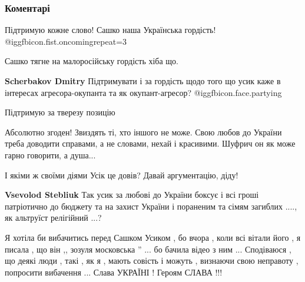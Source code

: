  
 
 
 
 
\subsubsection{Коментарі}
\label{sec:27_09_2021.fb.bojechko_andrej.1.istoria_z_usikom.cmt}

\begin{itemize} %
Підтримую кожне слово! Сашко наша Українська гордість!  @igg{fbicon.fist.oncoming}{repeat=3} 

\begin{itemize} %
Сашко тягне на малоросійську гордість хіба що.

\textbf{Scherbakov Dmitry} Підтримувати і за гордість щодо того що усик каже в
інтересах агресора-окупанта та як окупант-агресор? @igg{fbicon.face.partying} 
\end{itemize} %

Підтримую за тверезу позицію


Абсолютно згоден! Звиздять ті, хто іншого не може. Свою любов до України треба
доводити справами, а не словами, нехай і красивими. Шуфрич он як може гарно
говорити, а душа...

\begin{itemize} %
І якіми ж своїми діями Усік це довів? Давай аргументацію, діду!

\textbf{Vsevolod Stebliuk} Так усик за любові до України боксує і всі гроші патріотично до бюджету та на захист України і пораненим та сімям загиблих ...., як альтруїст релігійний ...?
\end{itemize} %


Я хотіла би вибачитись перед Сашком Усиком , бо вчора , коли всі вітали його ,
я писала , що він ,, зозуля московська '' ... бо бачила відео з ним ...
Сподіваюся , що деякі люди , такі , як я , мають совість і можуть , визнаючи
свою неправоту , попросити вибачення ... Слава УКРАЇНІ ! Героям СЛАВА !!!


\end{itemize}
